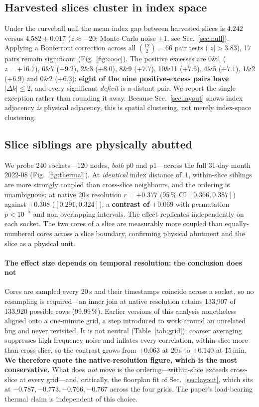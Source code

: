 \documentclass[10pt,conference]{IEEEtran}
\begin{document}
\subsection{Harvested slices cluster in index space}
\label{sec:cluster}
Under the curveball null the mean index gap between harvested slices is $4.242$ versus
$4.582\pm0.017$ ($z\approx-20$; Monte-Carlo noise $\pm1$, see Sec.~\ref{sec:null}). Applying a
Bonferroni correction across all $\binom{12}{2}=66$ pair
tests ($|z|>3.83$), 17 pairs remain significant (Fig.~\ref{fig:cooc}). The positive excesses are
0\&1 ($z=+16.7$), 6\&7 ($+9.2$), 2\&3 ($+8.0$), 8\&9 ($+7.7$), 10\&11 ($+7.5$), 4\&5 ($+7.1$),
1\&2 ($+6.9$) and 0\&2 ($+6.3$): \textbf{eight of the nine positive-excess pairs have
$|\Delta k|\le2$}, and every significant \emph{deficit} is a distant pair. We report the single
exception rather than rounding it away. Because Sec.~\ref{sec:layout} shows index adjacency
\emph{is} physical adjacency, this is spatial clustering, not merely index-space clustering.

\subsection{Slice siblings are physically abutted}
We probe 240 sockets---120 nodes, \emph{both} p0 and p1---across the full 31-day month 2022-08
(Fig.~\ref{fig:thermal}). At \emph{identical} index distance of~1, within-slice siblings are more
strongly coupled than cross-slice neighbours, and the ordering is unambiguous: at native 20\,s
resolution $r=+0.377$ (95\,\% CI $[0.366,0.387]$) against $+0.308$ ($[0.291,0.324]$), a
\textbf{contrast of $+0.069$} with permutation $p<10^{-5}$ and non-overlapping intervals. The
effect replicates independently on each socket. The two cores of a slice are measurably more coupled than
equally-numbered cores across a slice boundary, confirming physical abutment and the slice as a
physical unit.

\paragraph*{The effect size depends on temporal resolution; the conclusion does not}
\label{par:grid}
Cores are sampled every 20\,s and their timestamps coincide across a socket, so no resampling is
required---an inner join at native resolution retains 133{,}907 of 133{,}920 possible rows
(99.99\,\%). Earlier versions of this analysis nonetheless aligned onto a one-minute grid, a step
introduced to work around an unrelated bug and never revisited. It is not neutral
(Table~\ref{tab:grid}): coarser averaging suppresses high-frequency noise and inflates every
correlation, within-slice more than cross-slice, so the contrast grows from $+0.063$ at 20\,s to
$+0.140$ at 15\,min. \textbf{We therefore quote the native-resolution figure, which is the most
conservative.} What does \emph{not} move is the ordering---within-slice exceeds cross-slice at
every grid---and, critically, the floorplan fit of Sec.~\ref{sec:layout}, which sits at
$-0.787,-0.773,-0.766,-0.767$ across the four grids. The paper's load-bearing thermal claim is
independent of this choice.
\end{document}
